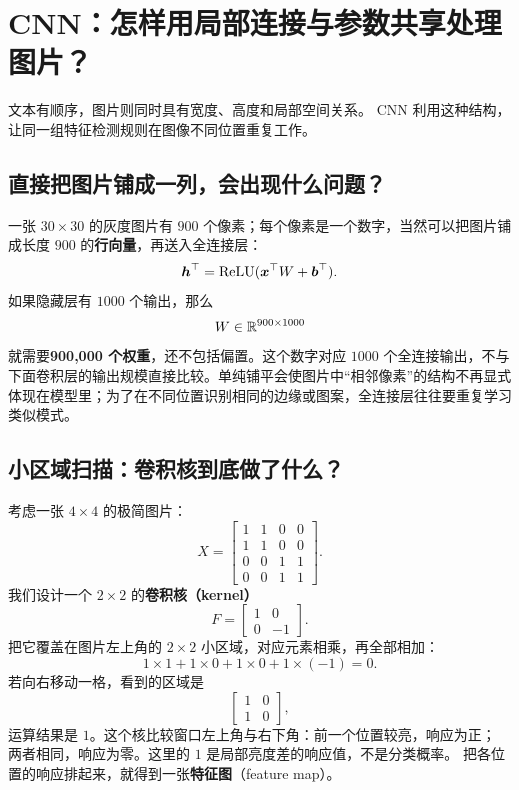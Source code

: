 \chapterrule
\section{CNN：怎样用局部连接与参数共享处理图片？}
\label{intro:cnn}

文本有顺序，图片则同时具有宽度、高度和局部空间关系。
CNN 利用这种结构，让同一组特征检测规则在图像不同位置重复工作。

\subsection{直接把图片铺成一列，会出现什么问题？}
\label{partq:vision}

一张 $30\times30$ 的灰度图片有 $900$ 个像素；每个像素是一个数字，当然可以把图片铺成长度 $900$ 的\textbf{行向量}，再送入全连接层：
\[
\boldsymbol{h}^\top=\operatorname{ReLU}(\boldsymbol{x}^\top W+\boldsymbol{b}^\top).
\]
如果隐藏层有 $1000$ 个输出，那么
\[
W\in\mathbb{R}^{900\times1000}
\]
就需要\textbf{900,000 个权重}，还不包括偏置。这个数字对应 $1000$ 个全连接输出，不与下面卷积层的输出规模直接比较。单纯铺平会使图片中“相邻像素”的结构不再显式体现在模型里；为了在不同位置识别相同的边缘或图案，全连接层往往要重复学习类似模式。

\subsection{小区域扫描：卷积核到底做了什么？}
\label{concept:kernel}
\label{concept:stride}
\label{concept:padding}
\label{concept:feature-map}

考虑一张 $4\times4$ 的极简图片：
\[
X=\begin{bmatrix}
1&1&0&0\\
1&1&0&0\\
0&0&1&1\\
0&0&1&1
\end{bmatrix}.
\]
我们设计一个 $2\times2$ 的\textbf{卷积核（kernel）}
\[
F=\begin{bmatrix}1&0\\0&-1\end{bmatrix}.
\]
把它覆盖在图片左上角的 $2\times2$ 小区域，对应元素相乘，再全部相加：
\[
1\times1+1\times0+1\times0+1\times(-1)=0.
\]
若向右移动一格，看到的区域是
\[
\begin{bmatrix}1&0\\1&0\end{bmatrix},
\]
运算结果是 $1$。这个核比较窗口左上角与右下角：前一个位置较亮，响应为正；
两者相同，响应为零。这里的 $1$ 是局部亮度差的响应值，不是分类概率。
把各位置的响应排起来，就得到一张\textbf{特征图}（feature map）。

